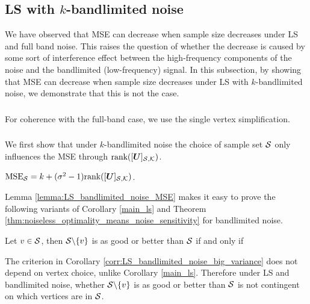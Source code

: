 \subsection{LS with $k$-bandlimited noise}
\label{sec:LS_bandlimited}
We have observed that MSE can decrease when sample size decreases under LS and full band noise. This raises the question of whether the decrease is caused by some sort of interference effect between the high-frequency components of the noise and the bandlimited (low-frequency) signal. In this subsection, by showing that MSE can decrease when sample size decreases under LS with $k$-bandlimited noise, we demonstrate that this is not the case.

\subsubsection{}
For coherence with the full-band case, we use the single vertex simplification.
\subsubsection{}
We first show that under $k$-bandlimited noise the choice of sample set $\mathcal{S}$ only influences the MSE through $\textrm{rank}(\matrsubU{S})$.
\begin{lemma}
\label{lemma:LS_bandlimited_noise_MSE}
$        \textrm{MSE}_{\set{S}} = k + (\sigma^2 - 1)\textrm{rank}(\matrsubU{S}) $.
\end{lemma}

\noindent Lemma \ref{lemma:LS_bandlimited_noise_MSE} makes it easy to prove the following variants of Corollary \ref{main_ls} and Theorem \ref{thm:noiseless_optimality_means_noise_sensitivity} for bandlimited noise.

\begin{corollary}
\label{corr:LS_bandlimited_noise_big_variance}
Let $v \in \mathcal{S}$, then $\mathcal{S}\backslash \{v\}$ is as good or better than $\mathcal{S}$ if and only if
\end{corollary}
\noindent The criterion in Corollary \ref{corr:LS_bandlimited_noise_big_variance} does not depend on vertex choice, unlike Corollary \ref{main_ls}. Therefore under LS and bandlimited noise, whether $\mathcal{S} \backslash \{v\}$ is as good or better than $\mathcal{S}$ is not contingent on which vertices are in $\mathcal{S}$.

